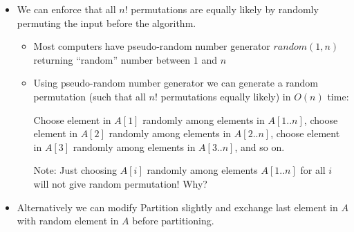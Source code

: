 \documentclass[11pt]{article}
\begin{document}
\begin{itemize}
\item We can enforce that all $n!$ permutations are equally likely by
randomly permuting the input before the algorithm.

\begin{itemize}
\item Most computers have pseudo-random number generator
  $random(1,n)$ returning ``random'' number between $1$ and $n$


\item Using pseudo-random number generator we can generate a random
  permutation (such that all $n!$ permutations equally likely) in
  $O(n)$ time:
  
  Choose element in $A[1]$ randomly among elements in $A[1..n]$,
  choose element in $A[2]$ randomly among elements in $A[2..n]$, 
  choose element in $A[3]$ randomly among elements in $A[3..n]$,
  and so on.
  
  Note: Just choosing $A[i]$ randomly among elements $A[1..n]$ for
  all $i$ will not give random permutation! Why?
\end{itemize}


\vspace{\baselineskip}


\item Alternatively we can modify {\sc Partition} slightly and exchange last
element in $A$ with random element in $A$ before partitioning.

\\

\vspace{\baselineskip}

\\

\end{itemize}
\end{document}
